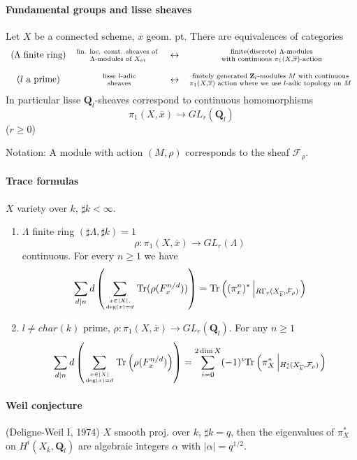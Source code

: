 \paragraph{Fundamental groups and lisse sheaves}
	Let $X$ be a connected scheme, $\overline x$ geom. pt. There are equivalences of categories 
		$$\begin{array}{ccccccc}
		\text{($\Lambda$ finite ring)}& \text{fin. loc. const. sheaves of }
		\atop \Lambda\text{-modules of }X_{et} & \leftrightarrow & \text{ finite(discrete) }\Lambda\text{-modules}\atop\text{ with continuous }\pi_1(X, \overline x)\text{-action}\\
		\\
		(l\text{ a prime}) & \text{ lisse }l\text{-adic}\atop\text{ sheaves} & \leftrightarrow & \text{ finitely generated }\mathbf{Z}_l\text{-modules } M \text{ with continuous }\atop \pi_1(X, \overline x)\text{ action where we use $l$-adic topology on } M
		\end{array}$$
In particular lisse $\mathbf{Q}_l$-sheaves correspond to continuous homomorphisms 
	$$\pi_1(X, \overline x) \to GL_r(\mathbf{Q}_l)$$
	($r\geq 0$)
	
Notation: A module with action $(M, \rho)$ corresponds to the sheaf $\mathcal{F}_\rho$. 

\paragraph{Trace formulas} $X$ variety over $k$, $\sharp k<\infty$. 
\begin{enumerate}
	\item $\Lambda$ finite ring $(\sharp \Lambda, \sharp k)=1$
		$$\rho: \pi_1(X, \overline x)\to GL_r(\Lambda)$$
		continuous. For every $n\geq 1$ we have
		$$\sum_{d|n}d\left(\sum_{x\in |X|, \atop\deg(x)=d}\text{Tr}(\rho(F_x^{n/d}))\right) = \text{Tr}\left((\pi_x^n)^*\left|_{R\Gamma_c(X_{\overline k}, \mathcal{F}_\rho)}\right.\right)$$
		
	\item $l\neq char(k)$ prime, $\rho: \pi_1(X, \overline x)\to GL_r(\mathbf{Q}_l)$. For any $n\geq 1$
		$$\sum_{d|n}d\left(\sum_{x\in |X|\atop \deg(x)=d}\text{Tr}\left(\rho(F_x^{n/d})\right)\right)=\sum_{i=0}^{2\dim X}(-1)^i \text{Tr}\left(\pi_X^*\left|_{H_c^i(X_{\overline k}, \mathcal{F}_\rho)}\right.\right)$$
\end{enumerate}

\paragraph{Weil conjecture}  (Deligne-Weil I, 1974) $X$ smooth proj. over $k$, $\sharp k=q$, then the eigenvalues of $\pi_X^*$ on $H^i(X_{\overline k}, \mathbf{Q}_l)$ are algebraic integers $\alpha$ with $|\alpha|=q^{1/2}$. 


